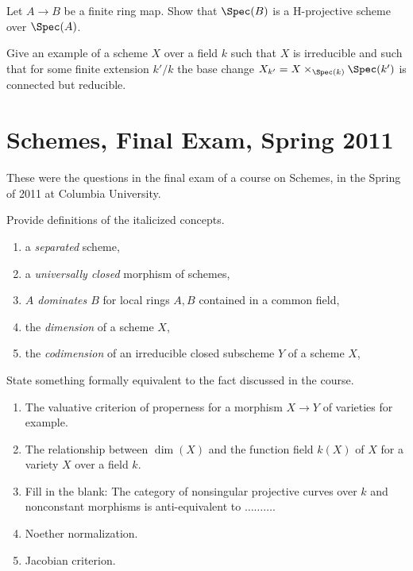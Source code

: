 \begin{exercise}
\label{exercise-finite-is-projective}
Let $A \to B$ be a finite ring map. Show that
$\Spec(B)$ is a H-projective scheme over $\Spec(A)$.
\end{exercise}

\begin{exercise}
\label{exercise-not-geometrically-irreducible}
Give an example of a scheme $X$ over a field $k$ such that
$X$ is irreducible and such that for some finite extension $k'/k$
the base change $X_{k'} = X \times_{\Spec(k)} \Spec(k')$
is connected but reducible.
\end{exercise}





\section{Schemes, Final Exam, Spring 2011}
\label{section-final-exam-spring-2011}

\noindent
These were the questions in the final exam of a course on Schemes,
in the Spring of 2011 at Columbia University.

\begin{exercise}[Definitions]
\label{exercise-definitions-spring-2011}
Provide definitions of the italicized concepts.
\begin{enumerate}
\item a {\it separated} scheme,
\item a {\it universally closed} morphism of schemes,
\item {\it $A$ dominates $B$} for local rings $A, B$ contained in a
common field,
\item the {\it dimension} of a scheme $X$,
\item the {\it codimension} of an irreducible closed subscheme $Y$
of a scheme $X$,
\end{enumerate}
\end{exercise}

\begin{exercise}[Results]
\label{exercise-results-spring-2011}
State something formally equivalent to the fact discussed
in the course.
\begin{enumerate}
\item The valuative criterion of properness for a morphism
$X \to Y$ of varieties for example.
\item The relationship between $\dim(X)$ and the function field
$k(X)$ of $X$ for a variety $X$ over a field $k$.
\item Fill in the blank: The category of nonsingular projective curves over
$k$ and nonconstant morphisms is anti-equivalent to $\ldots\ldots\ldots$.
\item Noether normalization.
\item Jacobian criterion.
\end{enumerate}
\end{exercise}

